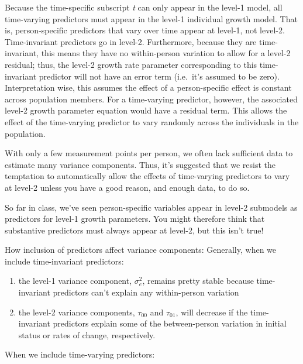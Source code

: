 \documentclass[
  letterpaper,
  DIV=11,
  numbers=noendperiod]{scrreprt}
\begin{document}
Because the time-specific subscript \emph{t} can only appear in the
level-1 model, all time-varying predictors must appear in the level-1
individual growth model. That is, person-specific predictors that vary
over time appear at level-1, not level-2. Time-invariant predictors go
in level-2. Furthermore, because they are time-invariant, this means
they have no within-person variation to allow for a level-2 residual;
thus, the level-2 growth rate parameter corresponding to this
time-invariant predictor will not have an error term (i.e.~it's assumed
to be zero). Interpretation wise, this assumes the effect of a
person-specific effect is constant across population members. For a
time-varying predictor, however, the associated level-2 growth parameter
equation would have a residual term. This allows the effect of the
time-varying predictor to vary randomly across the individuals in the
population.

With only a few measurement points per person, we often lack sufficient
data to estimate many variance components. Thus, it's suggested that we
resist the temptation to automatically allow the effects of time-varying
predictors to vary at level-2 unless you have a good reason, and enough
data, to do so.

So far in class, we've seen person-specific variables appear in level-2
submodels as predictors for level-1 growth parameters. You might
therefore think that substantive predictors must always appear at
level-2, but this isn't true!

How inclusion of predictors affect variance components: Generally, when
we include time-invariant predictors:

\begin{enumerate}
\def\labelenumi{\arabic{enumi}.}
\item
  the level-1 variance component, \(\sigma^2_e\), remains pretty stable
  because time-invariant predictors can't explain any within-person
  variation
\item
  the level-2 variance components, \(\tau_{00}\) and \(\tau_{01}\), will
  decrease if the time-invariant predictors explain some of the
  between-person variation in initial status or rates of change,
  respectively.
\end{enumerate}

When we include time-varying predictors:
\end{document}
